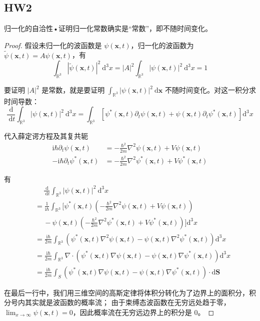 \subsection{HW2}
\begin{1}
归一化的自洽性•证明归一化常数确实是``常数''，即不随时间变化。
\end{1}
\begin{proof}
    假设未归一化的波函数是 $\psi(\mathbf{x}, t)$，归一化的波函数为 $\tilde{\psi}(\mathbf{x}, t)=A \psi(\mathbf{x}, t)$，有
$$\int_{\mathbb{R}^{3}}|\tilde{\psi}(\mathbf{x}, t)|^{2} \mathrm{~d}^{3} x
=|A|^{2} \int_{\mathbb{R}^{3}}|\psi(\mathbf{x}, t)|^{2} \mathrm{~d}^{3} x=1$$

要证明 $|A|^{2}$ 是常数，就是要证明 $\int_{\mathbb{R}^{3}}|\psi(\mathbf{x}, t)|^{2} \mathrm{~d} \mathbf{x}$ 不随时间变化。对这一积分求时间导数：
$$\frac{\mathrm{d}}{\mathrm{~d} t} \int_{\mathbb{R}^{3}}|\psi(\mathbf{x}, t)|^{2} \mathrm{~d}^{3} x
=\int_{\mathbb{R}^{3}}\left[\psi^{*}(\mathbf{x}, t) \partial_{t} \psi(\mathbf{x}, t)
+\psi(\mathbf{x}, t) \partial_{t} \psi^{*}(\mathbf{x}, t)\right] \mathrm{d}^{3} x$$

代入薛定谔方程及其复共轭
$$
\begin{aligned}
\mathrm{i} \hbar \partial_{t} \psi(\mathbf{x}, t) & =-\frac{\hbar^{2}}{2 m} \nabla^{2} \psi(\mathbf{x}, t)+V \psi(\mathbf{x}, t) \\
-\mathrm{i} \hbar \partial_{t} \psi^{*}(\mathbf{x}, t) & =-\frac{\hbar^{2}}{2 m} \nabla^{2} \psi^{*}(\mathbf{x}, t)+V \psi^{*}(\mathbf{x}, t)
\end{aligned}
$$

有
$$
\begin{aligned}
& \quad\ \frac{\mathrm{d}}{\mathrm{~d} t} \int_{\mathbb{R}^{3}}|\psi(\mathbf{x}, t)|^{2} \mathrm{~d}^{3} x \\
&= \frac{1}{\mathrm{i} \hbar} \int_{\mathbb{R}^{3}}\bigg[\psi^{*}(\mathbf{x}, t)\left(-\frac{\hbar^{2}}{2 m} \nabla^{2} \psi(\mathbf{x}, t)+V \psi(\mathbf{x}, t)\right) \\
& \quad\ -\psi(\mathbf{x}, t)\left(-\frac{\hbar^{2}}{2m} \nabla^{2} \psi^{*}(\mathbf{x}, t)+V \psi^{*}(\mathbf{x}, t)\right)\bigg] \mathrm{d}^{3} x \\
&= \frac{\mathrm{i} \hbar}{2m} \int_{\mathbb{R}^{3}}\left(\psi^{*}(\mathbf{x}, t) \nabla^{2} \psi(\mathbf{x}, t)-\psi(\mathbf{x}, t) \nabla^{2} \psi^{*}(\mathbf{x}, t)\right) \mathrm{d}^{3} x \\
&= \frac{\mathrm{i} \hbar}{2m} \int_{\mathbb{R}^{3}} \nabla \cdot\left(\psi^{*}(\mathbf{x}, t) \nabla \psi(\mathbf{x}, t)-\psi(\mathbf{x}, t) \nabla \psi^{*}(\mathbf{x}, t)\right) \mathrm{d}^{3} x \\
&= \frac{\mathrm{i} \hbar}{2m} \int_{S}\left(\psi^{*}(\mathbf{x}, t) \nabla \psi(\mathbf{x}, t)-\psi(\mathbf{x}, t) \nabla \psi^{*}(\mathbf{x}, t)\right) \cdot \mathrm{d} \mathbf{S}
\end{aligned}
$$

在最后一行中，我们用三维空间的高斯定律将体积分转化为了边界上的面积分，积分号内其实就是波函数的概率流；
由于束缚态波函数在无穷远处趋于零， $\lim_{x \rightarrow \infty} \psi(\mathbf{x}, t)=0$，因此概率流在无穷远边界上的积分是 $0$。
\end{proof}
